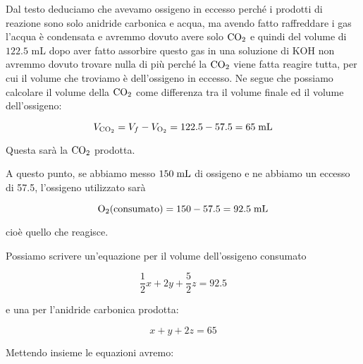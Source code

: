 \begin{soluzione}
    Dal testo deduciamo che avevamo ossigeno in eccesso perché i prodotti di reazione sono solo anidride carbonica e acqua, ma avendo fatto raffreddare i gas l'acqua è condensata e avremmo dovuto avere solo $\rm CO_2$ e quindi del volume di $122.5$ mL dopo aver fatto assorbire questo gas in una soluzione di KOH non avremmo dovuto trovare nulla di più perché la $\rm CO_2$ viene fatta reagire tutta, per cui il volume che troviamo è dell'ossigeno in eccesso. Ne segue che possiamo calcolare il volume della $\rm CO_2$ come differenza tra il volume finale ed il volume dell'ossigeno:

$$V_{\rm CO_2}=V_f - V_{\rm O_2}=122.5 -57.5=65 \; \rm mL$$

Questa sarà la $\rm CO_2$ prodotta.

A questo punto, se abbiamo messo $150 \; \rm mL$ di ossigeno e ne abbiamo un eccesso di 57.5, l'ossigeno utilizzato sarà

$$\rm O{_2}(consumato)=150-57.5=92.5 \; mL$$

cioè quello che reagisce.

Possiamo scrivere un'equazione per il volume dell'ossigeno consumato

$$\frac{1}{2}x + 2y + \frac{5}{2}z=92.5$$

e una per l'anidride carbonica prodotta:

$$x+y+2z=65$$

Mettendo insieme le equazioni avremo:


\end{soluzione}

